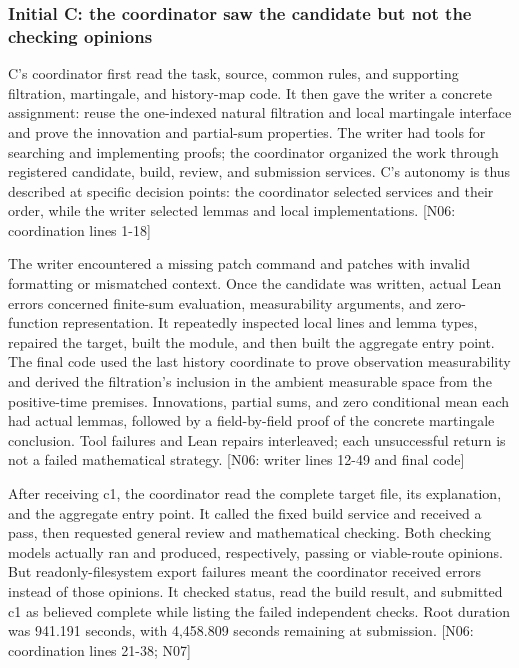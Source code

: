 \subsubsection[Initial C: the coordinator saw the candidate but not the checking opinions]{\texorpdfstring{\protect\hypertarget{g9-2}{}Initial C: the coordinator saw the candidate but not the checking opinions}{Initial C: the coordinator saw the candidate but not the checking opinions}}
C's coordinator first read the task, source, common rules, and supporting filtration, martingale, and history-map code. It then gave the writer a concrete assignment: reuse the one-indexed natural filtration and local martingale interface and prove the innovation and partial-sum properties. The writer had tools for searching and implementing proofs; the coordinator organized the work through registered candidate, build, review, and submission services. C's autonomy is thus described at specific decision points: the coordinator selected services and their order, while the writer selected lemmas and local implementations. [N06: coordination lines 1-18]

The writer encountered a missing patch command and patches with invalid formatting or mismatched context. Once the candidate was written, actual Lean errors concerned finite-sum evaluation, measurability arguments, and zero-function representation. It repeatedly inspected local lines and lemma types, repaired the target, built the module, and then built the aggregate entry point. The final code used the last history coordinate to prove observation measurability and derived the filtration's inclusion in the ambient measurable space from the positive-time premises. Innovations, partial sums, and zero conditional mean each had actual lemmas, followed by a field-by-field proof of the concrete martingale conclusion. Tool failures and Lean repairs interleaved; each unsuccessful return is not a failed mathematical strategy. [N06: writer lines 12-49 and final code]

After receiving c1, the coordinator read the complete target file, its explanation, and the aggregate entry point. It called the fixed build service and received a pass, then requested general review and mathematical checking. Both checking models actually ran and produced, respectively, passing or viable-route opinions. But readonly-filesystem export failures meant the coordinator received errors instead of those opinions. It checked status, read the build result, and submitted c1 as believed complete while listing the failed independent checks. Root duration was 941.191 seconds, with 4,458.809 seconds remaining at submission. [N06: coordination lines 21-38; N07]

